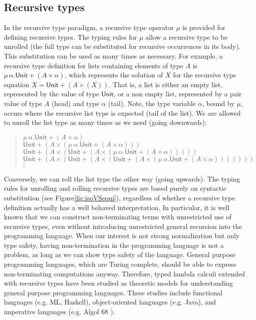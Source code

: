 \subsection{Recursive types}\label{ssec:rectype}

\newcommand{\List}{ \mu\,\alpha . \mathsf{Unit} + (A \times \alpha) }
\newcommand{\ListHole}[1]{ \mathsf{Unit} + (A \times (#1)) }

In the recursive type paradigm, a recursive type operator $\mu$ is provided
for defining recursive types. The typing rules for $\mu$ allow a recursive type
to be unrolled (\ie the full type can be substituted for recursive occurrences
in its body). This substitution can be used as many times as necessary.
For example, a recursive type definition for lists containing elements of
type $A$ is $\List$, which represents the solution of $X$ for
the recursive type equation $X = \ListHole{X}$. That is, a list is either
an empty list, represented by the value of type $\mathsf{Unit}$,
or a non empty list, represented by a pair value of type $A$ (head) and
type $\alpha$ (tail). Note, the type variable $\alpha$, bound by $\mu$, occurs
where the recursive list type is expected (\ie tail of the list). We are
allowed to unroll the list type as many times as we need (going downwards):
\begin{quote}
$\List$\\
$\ListHole{\List}$\\
$\ListHole{\ListHole{\List}}$\\
$\ListHole{\ListHole{\ListHole{\List}}}$\\
$\vdots$
\end{quote}
Conversely, we can roll the list type the other way (going upwards).
The typing rules for unrolling and rolling recursive types are based purely on
syntactic substitution (see Figure\;\ref{fig:isoVSequi}), regardless of whether
a recursive type definition actually has a well behaved interpretation.
In particular, it is well known that we can construct non-terminating terms
with unrestricted use of recursive types, even without introducing unrestricted
general recursion into the programming language. When our interest is
not strong normalization but only type safety, having non-termination
in the programming language is not a problem, as long as we can show
type safety of the language. General purpose programming languages,
which are Turing complete, should be able to express non-terminating
computations anyway. Therefore, typed lambda calculi extended with
recursive types have been studied as theoretic models for understanding
general purpose programming languages. These studies include
functional languages (e.g. ML, Haskell), object-oriented languages (e.g. Java),
and imperative languages (e.g. Algol 68 \cite{ALGOL68}).

